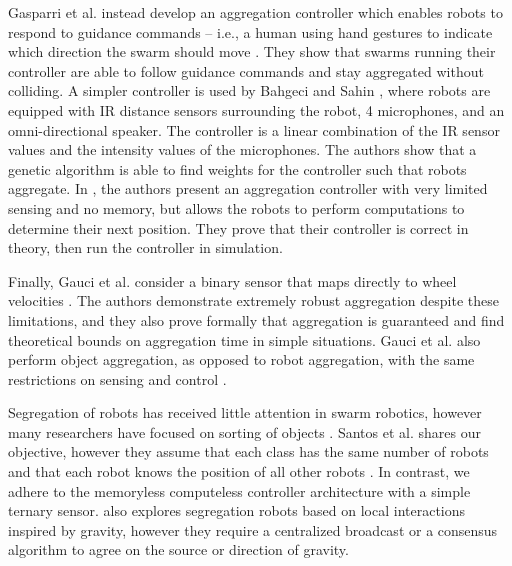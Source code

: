 \documentclass[conference]{IEEEtran}
\begin{document}
   Gasparri et al. instead develop an aggregation controller which enables robots to respond to guidance commands -- i.e., a human using hand gestures to indicate which direction the swarm should move \cite{gasparri_swarm_2012}. They show that swarms running their controller are able to follow guidance commands and stay aggregated without colliding. A simpler controller is used by Bahgeci and Sahin \cite{bahgeci_evolving_2005}, where robots are equipped with IR distance sensors surrounding the robot, 4 microphones, and an omni-directional speaker. The controller is a linear combination of the IR sensor values and the intensity values of the microphones. The authors show that a genetic algorithm is able to find weights for the controller such that robots aggregate. In \cite{ando_distributed_1999}, the authors present an aggregation controller with very limited sensing and no memory, but allows the robots to perform computations to determine their next position. They prove that their controller is correct in theory, then run the controller in simulation.

    Finally, Gauci et al. consider a binary sensor that maps directly to wheel velocities \cite{gauci_self-organized_2014}. The authors demonstrate extremely robust aggregation despite these limitations, and they also prove formally that aggregation is guaranteed and find theoretical bounds on aggregation time in simple situations. Gauci et al. also perform object aggregation, as opposed to robot aggregation, with the same restrictions on sensing and control \cite{gauci_clustering_2014}.

    Segregation of robots has received little attention in swarm robotics, however many researchers have focused on sorting of objects \cite{vardy_accelerated_2012} \cite{holland_collective_1998} \cite{tao_wang_collective_2004} \cite{holland_stigmergy_1999}. Santos et al. shares our objective, however they assume that each class has the same number of robots and that each robot knows the position of all other robots \cite{santos_segregation_2014}. In contrast, we adhere to the memoryless computeless controller architecture with a simple ternary sensor. \cite{gross_segregation_2009} also explores segregation robots based on local interactions inspired by gravity, however they require a centralized broadcast or a consensus algorithm to agree on the source or direction of gravity.

\end{document}
